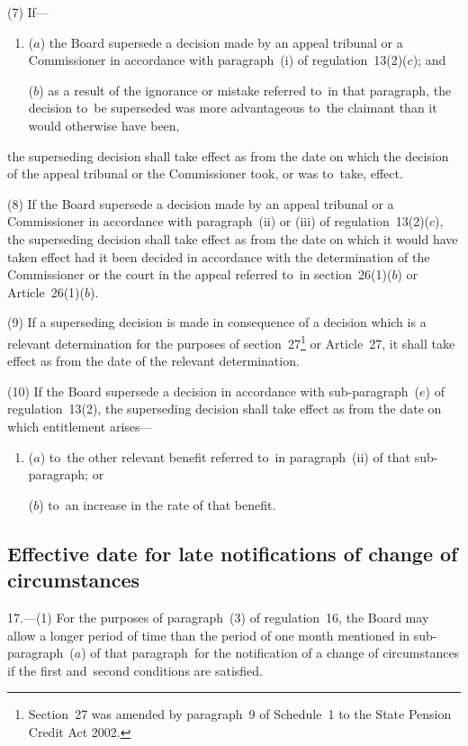 \documentclass[12pt,a4paper]{article}
\begin{document}
(7) If—
\begin{enumerate}\item[]
($a$) the Board supersede a decision made by an appeal tribunal or a Commissioner in accordance with paragraph~(i)  of regulation~13(2)($c$); and

($b$) as a result of the ignorance or mistake referred to~in that paragraph, the decision to~be superseded was more advantageous to~the claimant than it would otherwise have been,
\end{enumerate}
the superseding decision shall take effect as from the date on which the decision of the appeal tribunal or the Commissioner took, or was to~take, effect.

(8) If the Board supersede a decision made by an appeal tribunal or a Commissioner in accordance with paragraph~(ii)  or (iii)  of regulation~13(2)($c$), the superseding decision shall take effect as from the date on which it would have taken effect had it been decided in accordance with the determination of the Commissioner or the court in the appeal referred to~in section~26(1)($b$)  or Article~26(1)($b$).

(9) If a superseding decision is made in consequence of a decision which is a relevant determination for the purposes of section~27\footnote{Section~27 was amended by paragraph~9 of Schedule~1 to the State Pension Credit Act 2002.} or Article~27, it shall take effect as from the date of the relevant determination.

(10) If the Board supersede a decision in accordance with sub-paragraph~($e$)  of regulation~13(2), the superseding decision shall take effect as from the date on which entitlement arises—
\begin{enumerate}\item[]
($a$) to~the other relevant benefit referred to~in paragraph~(ii)  of that sub-paragraph; or

($b$) to~an increase in the rate of that benefit.
\end{enumerate}

\subsection[17. Effective date for late notifications of change of circumstances]{Effective date for late notifications of change of circumstances}

17.---(1)  For the purposes of paragraph~(3) of regulation~16, the Board may allow a longer period of time than the period of one month mentioned in sub-paragraph~($a$)  of that paragraph~for the notification of a change of circumstances if the first and~second conditions are satisfied.
\end{document}
